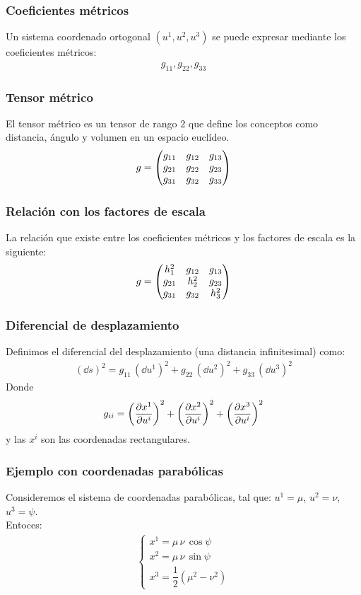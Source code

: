 \documentclass[12pt]{beamer}
\begin{document}
\begin{frame}
\frametitle{Coeficientes métricos}
Un sistema coordenado ortogonal $(u^{1}, u^{2}, u^{3})$ se puede expresar mediante los coeficientes métricos:
\begin{align*}
g_{11}, g_{22}, g_{33}
\end{align*}
\end{frame}
\begin{frame}
\frametitle{Tensor métrico}
El tensor métrico es un tensor de rango $2$ que define los conceptos como distancia, ángulo y volumen en un espacio euclídeo.
\pause
\begin{align*}
g = \mqty(
g_{11} & g_{12} & g_{13} \\
g_{21} & g_{22} & g_{23} \\
g_{31} & g_{32} & g_{33}
)
\end{align*}
\end{frame}
\begin{frame}
\frametitle{Relación con los factores de escala}
La relación que existe entre los coeficientes métricos y los factores de escala es la siguiente:
\pause
\begin{align*}
g = \mqty(
h_{1}^{2} & g_{12} & g_{13} \\
g_{21} & h_{2}^{2} & g_{23} \\
g_{31} & g_{32} & h_{3}^{2}
)
\end{align*}
\end{frame}
\begin{frame}
\frametitle{Diferencial de desplazamiento}
Definimos el diferencial del desplazamiento (una distancia infinitesimal) como:
\pause
\begin{align}
(\dd{s})^{2} = g_{11} \, (\dd{u^{1}})^{2} + g_{22} \, (\dd{u^{2}})^{2} + g_{33} \, (\dd{u^{3}})^{2}
\label{eq:ecuacion_01_01}
\end{align}
Donde \pause
\begin{align}
g_{ii} = \left( \pdv{x^{1}}{u^{i}} \right)^{2} + \left( \pdv{x^{2}}{u^{i}} \right)^{2} + \left( \pdv{x^{3}}{u^{i}} \right)^{2}
\label{eq:ecuacion_01_02}
\end{align}
y las $x^{i}$ son las coordenadas rectangulares.
\end{frame}
\begin{frame}
\frametitle{Ejemplo con coordenadas parabólicas}
Consideremos el sistema de coordenadas parabólicas, tal que: $u^{1} = \mu$, $u^{2} = \nu$, $u^{3} = \psi$.
\\
\bigskip
\pause
Entoces:
\begin{align*}
\begin{cases}
x^{1} = \mu \, \nu \, \cos \psi \\
x^{2} = \mu \, \nu \, \sin \psi \\
x^{3} = \dfrac{1}{2} (\mu^{2} - \nu^{2})
\end{cases}
\end{align*}  
\end{frame}
\end{document}
